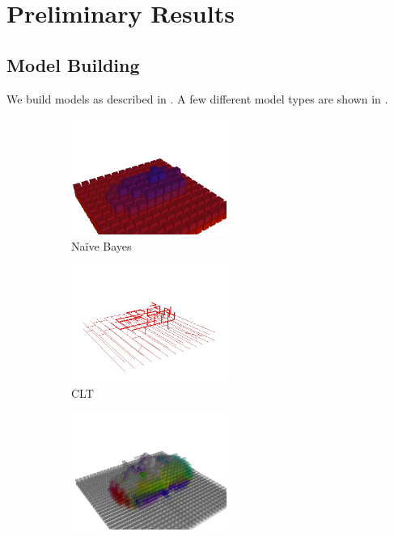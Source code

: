 \section{Preliminary Results}\label{sec:results}

\subsection{Model Building}

We build models as described in . A few different model
types are shown in .

\begin{figure}
  \centering
  \begin{subfigure}[]{0.3\linewidth}
    \centering
    \includegraphics[height=1.5in]{figures/car_marginal.jpg}
    \caption{Na\"ive Bayes}
    \label{fig:nb}
  \end{subfigure}
  \begin{subfigure}[]{0.3\linewidth}
    \centering
    \includegraphics[height=1.5in]{figures/car_tree.jpg}
    \caption{\ac{CLT}}
    \label{fig:clt}
  \end{subfigure}
  \begin{subfigure}[]{0.3\linewidth}
    \centering
    \includegraphics[height=1.5in]{figures/car_fm.jpg}

\end{subfigure}
\end{figure}
